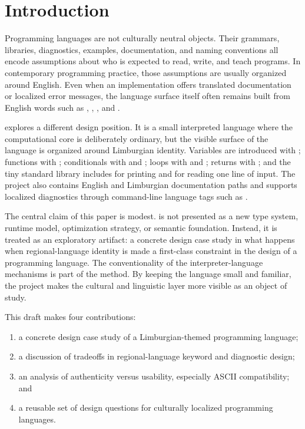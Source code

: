 \section{Introduction}

Programming languages are not culturally neutral objects. Their grammars,
libraries, diagnostics, examples, documentation, and naming conventions all
encode assumptions about who is expected to read, write, and teach programs.
In contemporary programming practice, those assumptions are usually organized
around English. Even when an implementation offers translated documentation or
localized error messages, the language surface itself often remains built from
English words such as , , , and .

\plat{} explores a different design position. It is a small interpreted
language where the computational core is deliberately ordinary, but the visible
surface of the language is organized around Limburgian identity. Variables are
introduced with ; functions with ; conditionals with
 and ; loops with  and ; returns
with ; and the tiny standard library includes  for
printing and  for reading one line of input. The project also
contains English and Limburgian documentation paths and supports localized
diagnostics through command-line language tags such as .

The central claim of this paper is modest. \plat{} is not presented as a new
type system, runtime model, optimization strategy, or semantic foundation.
Instead, it is treated as an exploratory artifact: a concrete design case study
in what happens when regional-language identity is made a first-class
constraint in the design of a programming language. The conventionality of the
interpreter-language mechanisms is part of the method. By keeping the language
small and familiar, the project makes the cultural and linguistic layer more
visible as an object of study.

This draft makes four contributions:

\begin{enumerate}
  \item a concrete design case study of a Limburgian-themed programming
        language;
  \item a discussion of tradeoffs in regional-language keyword and diagnostic
        design;
  \item an analysis of authenticity versus usability, especially ASCII
        compatibility; and
  \item a reusable set of design questions for culturally localized programming
        languages.
\end{enumerate}


